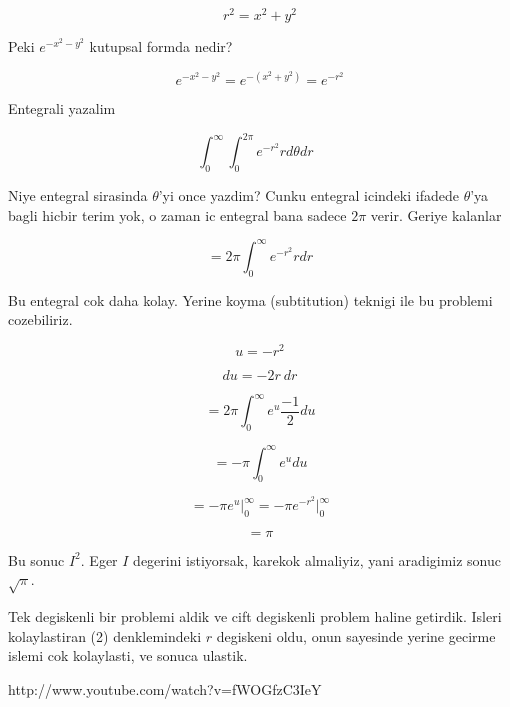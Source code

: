 \documentclass[12pt,fleqn]{article}\usepackage{../common}
\begin{document}
\[ r^2 = x^2 + y^2 \]

Peki $e^{-x^2-y^2}$ kutupsal formda nedir? 

\[ e^{-x^2-y^2} = e^{-(x^2+y^2)} = e^{-r^2} \]

Entegrali yazalim

\[ \int_{0}^{\infty} \int_{0}^{2\pi} e^{-r^2} r d\theta dr 
\ \ \ \label{2}
\]

Niye entegral sirasinda $\theta$'yi once yazdim? Cunku entegral icindeki
ifadede $\theta$'ya bagli hicbir terim yok, o zaman ic entegral bana sadece
$2\pi$ verir. Geriye kalanlar

\[=  2\pi \int_{0}^{\infty} e^{-r^2} r dr \]

Bu entegral cok daha kolay. Yerine koyma (subtitution) teknigi ile bu
problemi cozebiliriz. 

\[ u = -r^2 \]

\[ du =  -2r \ dr\]

\[=  2\pi \int_{0}^{\infty} e^u \frac{-1}{2} du \]

\[=  -\pi \int_{0}^{\infty} e^u  du \]

\[=  -\pi  e^u  \bigg|_{0}^{\infty} = -\pi  e^{-r^2}  \bigg|_{0}^{\infty} \]

\[ = \pi \]

Bu sonuc $I^2$. Eger $I$ degerini istiyorsak, karekok almaliyiz, yani
aradigimiz sonuc $\sqrt{\pi}$. 

Tek degiskenli bir problemi aldik ve cift degiskenli problem haline
getirdik. Isleri kolaylastiran (2) denklemindeki $r$ degiskeni oldu, onun
sayesinde yerine gecirme islemi cok kolaylasti, ve sonuca ulastik. 



http://www.youtube.com/watch?v=fWOGfzC3IeY
\end{document}
